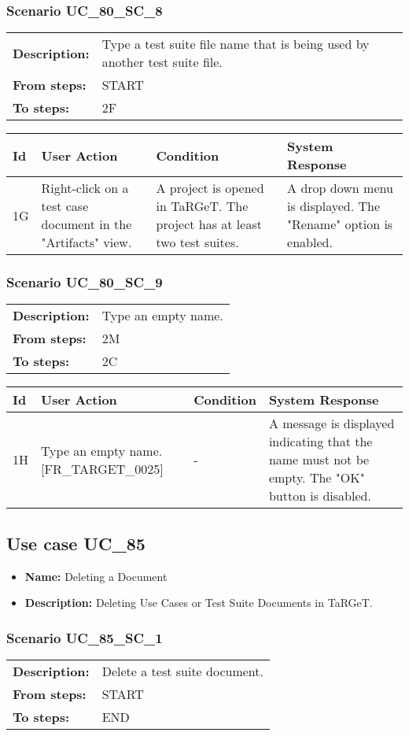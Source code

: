 \documentclass[a4paper,11pt]{article}
\newcommand{\bl}{\\ \hline}
\begin{document}
\subsubsection*{Scenario UC_80_SC_8}
\begin{tabular}{p{1in}p{4in}}
{\bf Description:} & Type a test suite file name that is being used by another test suite file. \\
{\bf From steps:} & START \\
{\bf To steps:} & 2F \\
\end{tabular}
 
\begin{tabular}{|p{0.8in}|p{1.6in}|p{1.6in}|p{1.6in}|}
\hline
Id & User Action & Condition & System Response  \bl 
1G & Right-click on a test case document in the "Artifacts" view. & A project is opened in TaRGeT. The project has at least two test suites. & A drop down menu is displayed. The "Rename" option is enabled. \bl 
\end{tabular}
\subsubsection*{Scenario UC_80_SC_9}
\begin{tabular}{p{1in}p{4in}}
{\bf Description:} & Type an empty name. \\
{\bf From steps:} & 2M \\
{\bf To steps:} & 2C \\
\end{tabular}
 
\begin{tabular}{|p{0.8in}|p{1.6in}|p{1.6in}|p{1.6in}|}
\hline
Id & User Action & Condition & System Response  \bl 
1H & Type an empty name. [FR_TARGET_0025] & - & A message is displayed indicating that the name must not be empty. The "OK" button is disabled. \bl 
\end{tabular}
\subsection*{Use case UC_85}
\begin{itemize}
\item {\bf Name: }Deleting a Document
\item {\bf Description: }Deleting Use Cases or Test Suite Documents in TaRGeT.
\end{itemize}
\subsubsection*{Scenario UC_85_SC_1}
\begin{tabular}{p{1in}p{4in}}
{\bf Description:} & Delete a test suite document. \\
{\bf From steps:} & START \\
{\bf To steps:} & END \\
\end{tabular}
 
\end{document}
